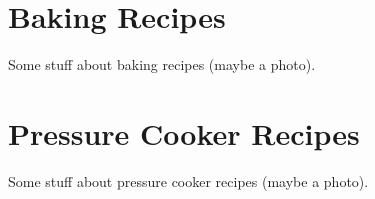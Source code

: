 \documentclass{article}
\begin{document}



\section{Baking Recipes}
Some stuff about baking recipes (maybe a photo).




\section{Pressure Cooker Recipes}
Some stuff about pressure cooker recipes (maybe a photo).


\end{document}
